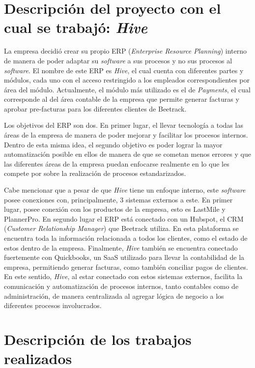     
\section{Descripción del proyecto con el cual se trabajó: \textit{Hive}}
    
    La empresa decidió crear su propio ERP (\textit{Enterprise Resource Planning}) interno de manera de poder adaptar su \textit{software} a sus procesos y no sus procesos al \textit{software}. El nombre de este ERP es \textit{Hive}, el cual cuenta con diferentes partes y módulos, cada uno con el acceso restringido a los empleados correspondientes por área del módulo. Actualmente, el módulo más utilizado es el de \textit{Payments}, el cual corresponde al del área contable de la empresa que permite generar facturas y aprobar pre-facturas para los diferentes clientes de Beetrack.

    Los objetivos del ERP son dos. En primer lugar, el llevar tecnología a todas las áreas de la empresa de manera de poder mejorar y facilitar los procesos internos. Dentro de esta misma idea, el segundo objetivo es poder lograr la mayor automatización posible en ellos de manera de que se cometan menos errores y que las diferentes áreas de la empresa puedan enfocarse realmente en lo que les compete por sobre la realización de procesos estandarizados.
    
    Cabe mencionar que a pesar de que \textit{Hive} tiene un enfoque interno, este \textit{software} posee conexiones con, principalmente, 3 sistemas externos a este. En primer lugar, posee conexión con los productos de la empresa, esto es LastMile y PlannerPro. En segundo lugar el ERP está conectado con un Hubspot, el CRM (\textit{Customer Relationship Manager}) que Beetrack utiliza. En esta plataforma se encuentra toda la información relacionada a todos los clientes, como el estado de estos dentro de la empresa. Finalmente, \textit{Hive} también se encuentra conectado fuertemente con Quickbooks, un SaaS utilizado para llevar la contabilidad de la empresa, permitiendo generar facturas, como también conciliar pagos de clientes. En este sentido, \textit{Hive}, al estar conectado con estos sistemas externos, facilita la comunicación y automatización de procesos internos, tanto contables como de administración, de manera centralizada al agregar lógica de negocio a los diferentes procesos involucrados.


\section{Descripción de los trabajos realizados}

